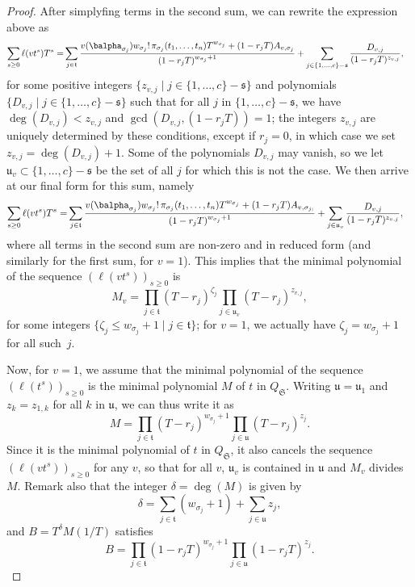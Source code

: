 \documentclass[12pt]{article}
\begin{document}
\begin{proof}
After simplyfing terms in the second sum, we can rewrite the
expression above as
\begin{align*}
  \sum_{s \ge 0} \ell(v t^s)T^s =&
  \sum_{j \in \mathfrak{t}} \frac{
v(\balpha_{\sigma_{j}})   w_{\sigma_{j}}!\, \pi_{{\sigma_{j}}}(t_1,\dots,t_n)
    T^{w_{\sigma_{j}}} + (1-r_{j}  T)A_{v,\sigma_{j}}}
      {(1-r_{j} T)^{w_{\sigma_{j}}+1}}  
+\sum_{j \in  \{1,\dots,c\}-\mathfrak{s}}
\frac{D_{v,j}}
  {(1-r_{j} T)^{z_{v,j}}},
\end{align*}
for some positive integers $\{z_{v,j} \mid j\in
\{1,\dots,c\}-\mathfrak{s}\}$ and polynomials $\{D_{v,j} \mid j\in
\{1,\dots,c\}-\mathfrak{s}\}$ such that for all $j$ in $
\{1,\dots,c\}-\mathfrak{s}$, we have $\deg(D_{v,j}) < z_{v,j}$ and
$\gcd(D_{v,j}, (1-r_{j} T))=1$; the integers $z_{v,j}$ are uniquely
determined by these conditions, except if $r_{j}=0$, in which case we
set $z_{v,j}=\deg(D_{v,j})+1$. Some of the polynomials $D_{v,j}$ may
vanish, so we let $\mathfrak{u}_v \subset \{1,\dots,c\}-\mathfrak{s}$
be the set of all $j$ for which this is not the case. 
We then arrive at our final form for this sum, namely
\begin{align}\label{eq:sumgenseries_collect1}
  \sum_{s \ge 0} \ell(v t^s)T^s =&
  \sum_{j \in \mathfrak{t}} \frac{
v(\balpha_{\sigma_{j}})   w_{\sigma_{j}}!\, \pi_{{\sigma_{j}}}(t_1,\dots,t_n)
    T^{w_{\sigma_{j}}} + (1-r_{j}  T)A_{v,\sigma_{j;}}}
      {(1-r_{j} T)^{w_{\sigma_{j}}+1}}  
+\sum_{j \in  \mathfrak{u}_v}
\frac{D_{v,j}}
  {(1-r_{j} T)^{z_{v,j}}},
\end{align}
where all terms in the second sum are non-zero and in reduced form
(and similarly for the first sum, for $v=1$).
This implies that the minimal
polynomial of the sequence $(\ell(vt^s))_{s \ge 0}$ is 
$$M_v=\prod_{j \in \mathfrak{t}} (T-r_{j})^{\zeta_j} \prod_{j
  \in \mathfrak{u}_v} (T-r_{j})^{z_{v,j}},$$
for some integers $\{\zeta_j \le w_{\sigma_{j}}+1 \mid j \in \mathfrak{t}\}$; for $v=1$, 
we actually have $\zeta_j = w_{\sigma_{j}}+1$ for all such~$j$.

Now, for $v=1$, we assume that the minimal polynomial of the sequence
$(\ell(t^s))_{s \ge 0}$ is the minimal polynomial $M$ of $t$ in
$Q_\mathfrak{S}$.  Writing $\mathfrak{u}=\mathfrak{u}_1$ and
$z_k=z_{1,k}$ for all $k$ in $\mathfrak{u}$, we can thus write it as
$$M=\prod_{j \in \mathfrak{t}} (T-r_{j})^{w_{\sigma_{j}}+1} \prod_{j
  \in \mathfrak{u}} (T-r_{j})^{z_{j}}.$$ Since it is the minimal
polynomial of $t$ in $Q_\mathfrak{S}$, it also cancels the sequence
$(\ell(v t^s))_{s \ge 0}$ for any $v$, so that for all $v$,
$\mathfrak{u}_v$ is contained in $\mathfrak{u}$ and $M_v$ divides $M$.
Remark also that the integer $\delta=\deg(M)$ is given by
$$\delta=\sum_{j \in \mathfrak{t}} (w_{\sigma_j}+1)
+\sum_{j\in\mathfrak{u}} z_{j},$$
and $B=T^{\delta}M(1/T)$ satisfies
$$B=\prod_{j \in \mathfrak{t}}(1-r_{j} T)^{w_{\sigma_j}+1} \prod_{j \in
  \mathfrak{u}}(1-r_{j} T)^{z_{j}}.$$ 


\end{proof}
\end{document}
